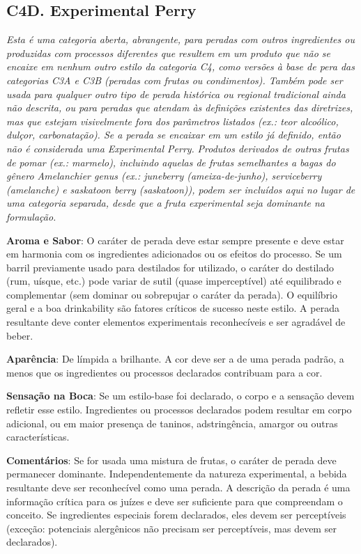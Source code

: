 \subsection*{C4D. Experimental Perry}

\textit{Esta é uma categoria aberta, abrangente, para peradas com outros ingredientes ou produzidas com processos diferentes que resultem em um produto que não se encaixe em nenhum outro estilo da categoria C4, como versões à base de pera das categorias C3A e C3B (peradas com frutas ou condimentos). Também pode ser usada para qualquer outro tipo de perada histórica ou regional tradicional ainda não descrita, ou para peradas que atendam às definições existentes das diretrizes, mas que estejam visivelmente fora dos parâmetros listados (ex.: teor alcoólico, dulçor, carbonatação). Se a perada se encaixar em um estilo já definido, então não é considerada uma Experimental Perry.}
\textit{Produtos derivados de outras frutas de pomar (ex.: marmelo), incluindo aquelas de frutas semelhantes a bagas do gênero \textit{Amelanchier genus} (ex.: juneberry (ameixa-de-junho), serviceberry (amelanche) e saskatoon berry (saskatoon)), podem ser incluídos aqui no lugar de uma categoria separada, desde que a fruta experimental seja dominante na formulação.}

\textbf{Aroma e Sabor}: O caráter de perada deve estar sempre presente e deve estar em harmonia com os ingredientes adicionados ou os efeitos do processo. Se um barril previamente usado para destilados for utilizado, o caráter do destilado (rum, uísque, etc.) pode variar de sutil (quase imperceptível) até equilibrado e complementar (sem dominar ou sobrepujar o caráter da perada). O equilíbrio geral e a boa drinkability são fatores críticos de sucesso neste estilo. A perada resultante deve conter elementos experimentais reconhecíveis e ser agradável de beber.

\textbf{Aparência}: De límpida a brilhante. A cor deve ser a de uma perada padrão, a menos que os ingredientes ou processos declarados contribuam para a cor.

\textbf{Sensação na Boca}: Se um estilo-base foi declarado, o corpo e a sensação devem refletir esse estilo. Ingredientes ou processos declarados podem resultar em corpo adicional, ou em maior presença de taninos, adstringência, amargor ou outras características.

\textbf{Comentários}: Se for usada uma mistura de frutas, o caráter de perada deve permanecer dominante. Independentemente da natureza experimental, a bebida resultante deve ser reconhecível como uma perada. A descrição da perada é uma informação crítica para os juízes e deve ser suficiente para que compreendam o conceito. Se ingredientes especiais forem declarados, eles devem ser perceptíveis (exceção: potenciais alergênicos não precisam ser perceptíveis, mas devem ser declarados).

